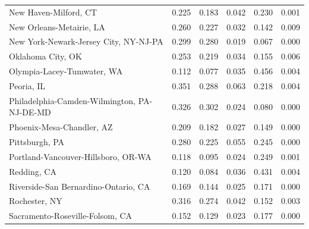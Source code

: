 \documentclass[
  10pt,
]{article}
\begin{document}
\begin{table}
\begin{tabular}{lrrrrr}
New Haven-Milford, CT                        &              0.225 &              0.183 &                 0.042 &           0.230 &       0.001 \\
New Orleans-Metairie, LA                     &              0.260 &              0.227 &                 0.032 &           0.142 &       0.009 \\
New York-Newark-Jersey City, NY-NJ-PA        &              0.299 &              0.280 &                 0.019 &           0.067 &       0.000 \\
Oklahoma City, OK                            &              0.253 &              0.219 &                 0.034 &           0.155 &       0.006 \\
Olympia-Lacey-Tumwater, WA                   &              0.112 &              0.077 &                 0.035 &           0.456 &       0.004 \\
Peoria, IL                                   &              0.351 &              0.288 &                 0.063 &           0.218 &       0.004 \\
Philadelphia-Camden-Wilmington, PA-NJ-DE-MD  &              0.326 &              0.302 &                 0.024 &           0.080 &       0.000 \\
Phoenix-Mesa-Chandler, AZ                    &              0.209 &              0.182 &                 0.027 &           0.149 &       0.000 \\
Pittsburgh, PA                               &              0.280 &              0.225 &                 0.055 &           0.245 &       0.000 \\
Portland-Vancouver-Hillsboro, OR-WA          &              0.118 &              0.095 &                 0.024 &           0.249 &       0.001 \\
Redding, CA                                  &              0.120 &              0.084 &                 0.036 &           0.431 &       0.004 \\
Riverside-San Bernardino-Ontario, CA         &              0.169 &              0.144 &                 0.025 &           0.171 &       0.000 \\
Rochester, NY                                &              0.316 &              0.274 &                 0.042 &           0.152 &       0.003 \\
Sacramento-Roseville-Folsom, CA              &              0.152 &              0.129 &                 0.023 &           0.177 &       0.000 \\

\end{tabular}
\end{table}
\end{document}
